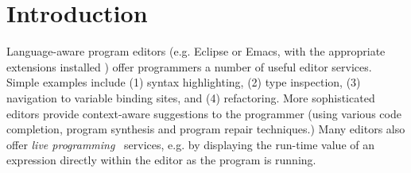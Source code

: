 \documentclass[letterpaper,USenglish]{lipics-v2016}
\newcommand{\Hazel}[0]{\textsf{Hazel}}
\newcommand{\HazelEnv}[0]{\Hazel}
\begin{document}
\begin{abstract}


\end{abstract}


\section{Introduction}



Language-aware program editors (e.g. Eclipse
or Emacs, with the appropriate  
extensions installed \cite{gamma2004contributing}) offer programmers a number of useful editor services. Simple examples include (1)
syntax highlighting, (2)
type inspection, (3)
navigation to variable binding sites, and (4)
refactoring. More sophisticated editors provide context-aware suggestions to the programmer (using various code completion, program synthesis and program repair techniques.) Many editors also offer \emph{live programming}~\cite{McDirmid:2007:LUL:1297027.1297073,Burckhardt:2013:ACF:2491956.2462170} services, e.g. by displaying the run-time value of an expression directly within the editor as the program is running. 
\end{document}
